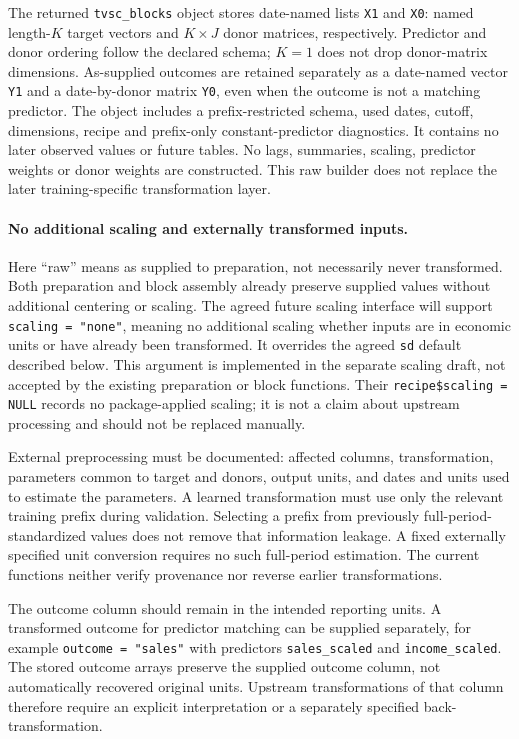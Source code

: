 \documentclass[11pt]{article}
\begin{document}
The returned \texttt{tvsc\_blocks} object stores date-named lists
\texttt{X1} and \texttt{X0}: named length-$K$ target vectors and $K\times J$
donor matrices, respectively. Predictor and donor ordering follow the
declared schema; $K=1$ does not drop donor-matrix dimensions. As-supplied
outcomes are retained separately as a date-named vector \texttt{Y1} and a
date-by-donor matrix \texttt{Y0}, even when the outcome is not a matching
predictor. The object includes a prefix-restricted schema, used dates,
cutoff, dimensions, recipe and prefix-only constant-predictor diagnostics.
It contains no later observed values or future tables. No lags, summaries,
scaling, predictor weights or donor weights are constructed. This raw
builder does not replace the later training-specific transformation layer.

\paragraph{No additional scaling and externally transformed inputs.}
Here ``raw'' means as supplied to preparation, not necessarily never
transformed. Both preparation and block assembly already preserve supplied
values without additional centering or scaling. The agreed future scaling
interface will support \texttt{scaling = "none"}, meaning no additional
scaling whether inputs are in economic units or have already been
transformed. It overrides the agreed \texttt{sd} default described below.
This argument is implemented in the separate scaling draft, not accepted
by the existing preparation or block functions. Their
\texttt{recipe\$scaling = NULL} records no package-applied scaling; it is
not a claim about upstream processing and should not be replaced manually.

External preprocessing must be documented: affected columns, transformation,
parameters common to target and donors, output units, and dates and units
used to estimate the parameters. A learned transformation must use only
the relevant training prefix during validation. Selecting a prefix from
previously full-period-standardized values does not remove that information
leakage. A fixed externally specified unit conversion requires no such
full-period estimation. The current functions neither verify provenance
nor reverse earlier transformations.

The outcome column should remain in the intended reporting units. A
transformed outcome for predictor matching can be supplied separately, for
example \texttt{outcome = "sales"} with predictors
\texttt{sales\_scaled} and \texttt{income\_scaled}. The stored outcome
arrays preserve the supplied outcome column, not automatically recovered
original units. Upstream transformations of that column therefore require
an explicit interpretation or a separately specified back-transformation.
\end{document}
